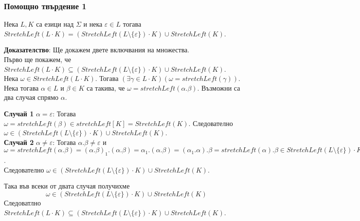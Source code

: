 \documentclass[12pt]{article}
\begin{document}
\subsubsection*{Помощно твърдение 1}
Нека \(L, K\) са езици над \(\Sigma\) и нека \(\varepsilon \in L\) тогава 
\(StretchLeft(L \cdot K) = (StretchLeft(L \setminus \{\varepsilon\}) \cdot K) \cup StretchLeft(K)\).

\vspace*{5mm}

\textbf{Доказателство}: Ще докажем двете включвания на множества. \\
Първо ще покажем, че \\
\(StretchLeft(L \cdot K) \subseteq (StretchLeft(L \setminus \{\varepsilon\}) \cdot K) \cup StretchLeft(K)\). \\
Нека \(\omega \in StretchLeft(L \cdot K)\). Тогава \((\exists \gamma \in L \cdot K)(\omega = stretchLeft(\gamma))\).
Нека тогава \(\alpha \in L\) и \(\beta \in K\) са такива, че \(\omega = stretchLeft(\alpha . \beta)\).
Възможни са два случая спрямо \(\alpha\). \\

\vspace*{5mm}

\textbf{Случай 1} \(\alpha = \varepsilon\):
Тогава \(\omega = stretchLeft(\beta) \in stretchLeft[K] = StretchLeft(K)\).
Следователно \(\omega \in (StretchLeft(L \setminus \{\varepsilon\}) \cdot K) \cup StretchLeft(K)\). \\

\vspace*{5mm}
\textbf{Случай 2} \(\alpha \neq \varepsilon\):
Тогава \(\alpha.\beta \neq \varepsilon\) и
\(\omega = stretchLeft(\alpha . \beta) = (\alpha.\beta)_1.(\alpha.\beta) = \alpha_1.(\alpha.\beta)
= (\alpha_1.\alpha).\beta =  stretchLeft(\alpha) . \beta \in StretchLeft(L \setminus \{\varepsilon\}) \cdot K\). \\
Следователно \(\omega \in (StretchLeft(L \setminus \{\varepsilon\}) \cdot K) \cup StretchLeft(K)\). \\

\vspace*{3mm}

Така във всеки от двата случая получихме
\[\omega \in (StretchLeft(L \setminus \{\varepsilon\}) \cdot K) \cup StretchLeft(K)\]
Следоватлно \(StretchLeft(L \cdot K) \subseteq (StretchLeft(L \setminus \{\varepsilon\}) \cdot K) \cup StretchLeft(K)\). \\

\vspace*{3mm}
\end{document}
